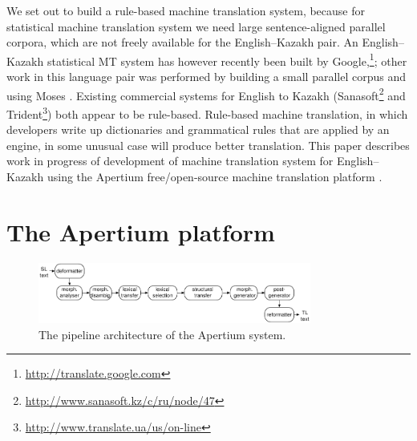 \documentclass[11pt]{article}
\begin{document}
We set out to build a rule-based machine translation system, because for statistical machine translation 
system we need large sentence-aligned parallel corpora, which are not freely available
for the English--Kazakh pair. An English--Kazakh statistical MT system has however recently been built by Google,\footnote{\url{http://translate.google.com}}; 
other work in this language pair was performed by building a small parallel corpus and using Moses \citep{assylbekov14}. Existing commercial systems for English to Kazakh (Sanasoft\footnote{\url{http://www.sanasoft.kz/c/ru/node/47}} and Trident\footnote{\url{http://www.translate.ua/us/on-line}}) both appear to be rule-based. 
Rule-based machine translation, in which developers 
write up dictionaries and grammatical rules that are applied by an engine, in some 
unusual case will produce better translation.
This paper describes work in progress of development of machine translation system 
for English--Kazakh using the Apertium free/open-source machine 
translation platform \citep{forcada11}. %

\section{The Apertium platform}

\begin{figure}[htbp]
\begin{center}
 \includegraphics[width=0.8\textwidth]{architecture.pdf}
\end{center}
\caption{The pipeline architecture of the Apertium system.}
\label{fig:modules}
\vspace{-1em}
\end{figure}
\end{document}
